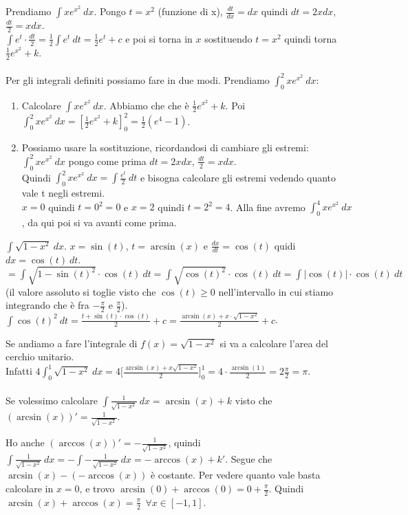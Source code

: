 \begin{example}
Prendiamo $\int xe^{x^2}\:dx$. Pongo $t=x^2$ (funzione di x), $\frac{dt}{dx} = dx$ quindi $dt = 2xdx$, $\frac{dt}{2} = xdx$.\\
$\int e^t \cdot \frac{dt}{2} = \frac{1}{2}\int e^t \:dt = \frac{1}{2} e^t +c$ e poi si torna in $x$ sostituendo $t=x^2$ quindi torna $\frac{1}{2}e^{x^2} + k$.\\\\
Per gli integrali definiti possiamo fare in due modi. Prendiamo $\int_0^2 xe^{x^2}\:dx$:
\begin{enumerate}
    \item Calcolare $\int xe^{x^2}\:dx$. Abbiamo che che è $\frac{1}{2}e^{x^2} + k$. Poi $\int_0^2 xe^{x^2}\:dx = [\frac{1}{2}e^{x^2} + k]_0^2 = \frac{1}{2}(e^4-1)$.
    \item Possiamo usare la sostituzione, ricordandosi di cambiare gli estremi: $\int_0^2 xe^{x^2}\:dx$ pongo come prima  $dt = 2xdx$, $\frac{dt}{2} = xdx$.\\
    Quindi $\int_0^2 xe^{x^2}\:dx = \int \frac{e^t}{2}\:dt$ e bisogna calcolare gli estremi vedendo quanto vale t negli estremi.\\
    $x= 0$ quindi $t = 0^2 = 0$ e $x = 2$ quindi $t = 2^2 = 4$. Alla fine avremo  $\int_0^4 xe^{x^2}\:dx$, da qui poi si va avanti come prima.
\end{enumerate}
\end{example}

\begin{example}
$\int \sqrt{1-x^2}\:dx$. $x = \sin(t)$, $t = \arcsin(x)$ e $\frac{dx}{dt} = \cos(t)$ quidi $dx = \cos(t) \:dt$.\\
$= \int \sqrt{1-\sin(t)^2} \cdot \cos(t) \:dt = \int \sqrt{\cos(t)^2} \cdot \cos(t) \:dt = \int |\cos(t)| \cdot \cos(t) \:dt$ (il valore assoluto si toglie visto che $\cos(t) \geq 0$ nell'intervallo in cui stiamo integrando che è fra $-\frac{\pi}{2}$ e $\frac{\pi}{2}$).\\
$\int \cos(t)^2 \:dt = \frac{t + \sin(t)\cdot\cos(t)}{2} + c = \frac{\arcsin(x) + x \cdot \sqrt{1 - x^2}}{2} + c$.
\end{example}

\hspace{-15pt}Se andiamo a fare l'integrale di $f(x) = \sqrt{1-x^2}$ si va a calcolare l'area del cerchio unitario.\\
Infatti $4 \int_0^1 \sqrt{1-x^2}\:dx = 4\big[\frac{\arcsin(x) + x\sqrt{1-x^2}}{2}\big]_0^1 = 4 \cdot \frac{\arcsin(1)}{2} = 2 \frac{\pi}{2} = \pi$.\\\\
Se volessimo calcolare $\int \frac{1}{\sqrt{1 - x^2}}\:dx = \arcsin(x) + k$ visto che $(\arcsin(x))' = \frac{1}{\sqrt{1 - x^2}}$.
\begin{observation}
Ho anche $(\arccos(x))' = -\frac{1}{\sqrt{1-x^2}}$, quindi $\int \frac{1}{\sqrt{1-x^2}}\:dx = -\int -\frac{1}{\sqrt{1-x^2}}\:dx = -\arccos(x) + k'$. Segue che $\arcsin(x) - (-\arccos(x))$ è costante. Per vedere quanto vale basta calcolare in $x=0$, e trovo $\arcsin(0) + \arccos(0) = 0 + \frac{\pi}{2}$. Quindi  $\arcsin(x) + \arccos(x) = \frac{\pi}{2} \:\: \forall x \in [-1,1]$.
\end{observation}

